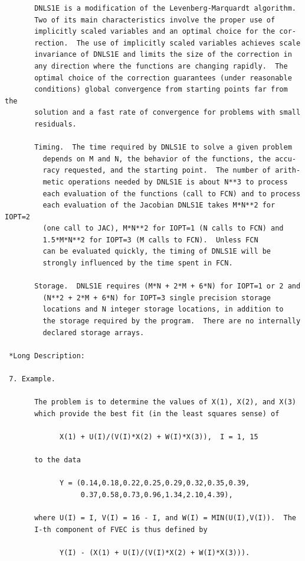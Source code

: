 \documentclass[11pt,twoside]{article}
\begin{document}
\begin{verbatim}
       DNLS1E is a modification of the Levenberg-Marquardt algorithm.
       Two of its main characteristics involve the proper use of
       implicitly scaled variables and an optimal choice for the cor-
       rection.  The use of implicitly scaled variables achieves scale
       invariance of DNLS1E and limits the size of the correction in
       any direction where the functions are changing rapidly.  The
       optimal choice of the correction guarantees (under reasonable
       conditions) global convergence from starting points far from the
       solution and a fast rate of convergence for problems with small
       residuals.

       Timing.  The time required by DNLS1E to solve a given problem
         depends on M and N, the behavior of the functions, the accu-
         racy requested, and the starting point.  The number of arith-
         metic operations needed by DNLS1E is about N**3 to process
         each evaluation of the functions (call to FCN) and to process
         each evaluation of the Jacobian DNLS1E takes M*N**2 for IOPT=2
         (one call to JAC), M*N**2 for IOPT=1 (N calls to FCN) and
         1.5*M*N**2 for IOPT=3 (M calls to FCN).  Unless FCN
         can be evaluated quickly, the timing of DNLS1E will be
         strongly influenced by the time spent in FCN.

       Storage.  DNLS1E requires (M*N + 2*M + 6*N) for IOPT=1 or 2 and
         (N**2 + 2*M + 6*N) for IOPT=3 single precision storage
         locations and N integer storage locations, in addition to
         the storage required by the program.  There are no internally
         declared storage arrays.

 *Long Description:

 7. Example.

       The problem is to determine the values of X(1), X(2), and X(3)
       which provide the best fit (in the least squares sense) of

             X(1) + U(I)/(V(I)*X(2) + W(I)*X(3)),  I = 1, 15

       to the data

             Y = (0.14,0.18,0.22,0.25,0.29,0.32,0.35,0.39,
                  0.37,0.58,0.73,0.96,1.34,2.10,4.39),

       where U(I) = I, V(I) = 16 - I, and W(I) = MIN(U(I),V(I)).  The
       I-th component of FVEC is thus defined by

             Y(I) - (X(1) + U(I)/(V(I)*X(2) + W(I)*X(3))).


\end{verbatim}
\end{document}
